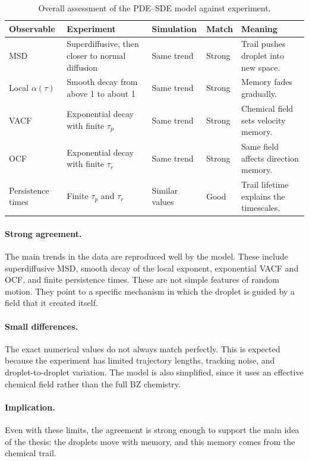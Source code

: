 \begin{table}[htbp]
\centering
\caption{Overall assessment of the PDE--SDE model against experiment.}
\label{tab:overall_assessment}
\renewcommand{\arraystretch}{1.25}
\begin{tabular}{p{1.8cm} p{3.2cm} p{3.0cm} p{1.4cm} p{3.0cm}}
\hline\hline
\textbf{Observable} & \textbf{Experiment} & \textbf{Simulation} & \textbf{Match} & \textbf{Meaning} \\
\hline
MSD & Superdiffusive, then closer to normal diffusion & Same trend & Strong & Trail pushes droplet into new space. \\[4pt]
Local $\alpha(\tau)$ & Smooth decay from above 1 to about 1 & Same trend & Strong & Memory fades gradually. \\[4pt]
VACF & Exponential decay with finite $\tau_p$ & Same trend & Strong & Chemical field sets velocity memory. \\[4pt]
OCF & Exponential decay with finite $\tau_r$ & Same trend & Strong & Same field affects direction memory. \\[4pt]
Persistence times & Finite $\tau_p$ and $\tau_r$ & Similar values & Good & Trail lifetime explains the timescales. \\
\hline\hline
\end{tabular}
\end{table}

\paragraph{Strong agreement.}
The main trends in the data are reproduced well by the model. These include superdiffusive MSD, smooth decay of the local exponent, exponential VACF and OCF, and finite persistence times. These are not simple features of random motion. They point to a specific mechanism in which the droplet is guided by a field that it created itself.

\paragraph{Small differences.}
The exact numerical values do not always match perfectly. This is expected because the experiment has limited trajectory lengths, tracking noise, and droplet-to-droplet variation. The model is also simplified, since it uses an effective chemical field rather than the full BZ chemistry.

\paragraph{Implication.}
Even with these limits, the agreement is strong enough to support the main idea of the thesis: the droplets move with memory, and this memory comes from the chemical trail.

